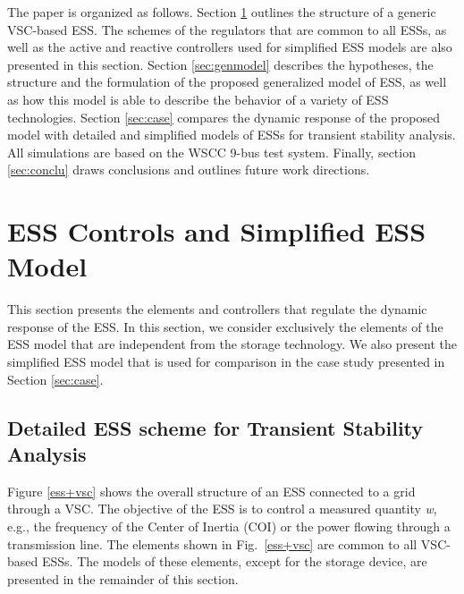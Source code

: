 \documentclass[journal, a4paper]{IEEEtran}
\begin{document}
The paper is organized as follows.  Section \ref{sec:overview}
outlines the structure of a generic VSC-based ESS.  The schemes of the
regulators that are common to all ESSs, as well as the active and
reactive controllers used for simplified ESS models are also presented
in this section.  Section \ref{sec:genmodel} describes the hypotheses,
the structure and the formulation of the proposed generalized model of
ESS, as well as how this model is able to describe the behavior of a
variety of ESS technologies.  Section \ref{sec:case} compares the
dynamic response of the proposed model with detailed and simplified
models of ESSs for transient stability
analysis. All simulations are based on the WSCC 9-bus
test system.
Finally, section \ref{sec:conclu} draws conclusions and outlines
future work directions.



\section{ESS Controls and Simplified ESS Model}
\label{sec:overview}

This section presents the elements and controllers that regulate the
dynamic response of the ESS.  In this section, we consider exclusively
the elements of the ESS model that are independent from the storage
technology.  We also present the simplified ESS model that is used for
comparison in the case study presented in Section \ref{sec:case}.
\vspace{-2.5mm}
\subsection{Detailed ESS scheme for Transient Stability Analysis}
\label{subsec:ESSscheme}

Figure \ref{ess+vsc} shows the overall structure of an ESS connected
to a grid through a VSC.  The objective of
the ESS is to control a measured quantity {\it w}, e.g., the frequency
of the Center of Inertia (COI) or the power flowing through a
transmission line.  The elements shown in Fig.~\ref{ess+vsc}
are common to all VSC-based ESSs.  The models
of these elements, except for the storage device,
are presented in the remainder of this section.
\end{document}
